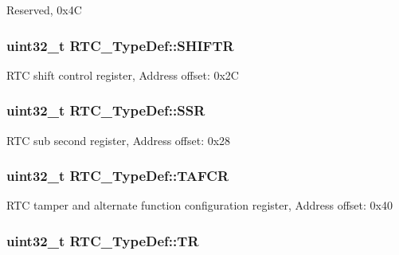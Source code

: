 Reserved, 0x4\-C \hypertarget{struct_r_t_c___type_def_a6082856c9191f5003b6163c0d3afcaff}{
\subsubsection[{S\-H\-I\-F\-T\-R}]{ uint32\-\_\-t R\-T\-C\-\_\-\-Type\-Def\-::\-S\-H\-I\-F\-T\-R}}\label{struct_r_t_c___type_def_a6082856c9191f5003b6163c0d3afcaff}
R\-T\-C shift control register, Address offset\-: 0x2\-C \hypertarget{struct_r_t_c___type_def_aefbd38be87117d1fced289bf9c534414}{
\subsubsection[{S\-S\-R}]{ uint32\-\_\-t R\-T\-C\-\_\-\-Type\-Def\-::\-S\-S\-R}}\label{struct_r_t_c___type_def_aefbd38be87117d1fced289bf9c534414}
R\-T\-C sub second register, Address offset\-: 0x28 \hypertarget{struct_r_t_c___type_def_a498ecce9715c916dd09134fddd0072c0}{
\subsubsection[{T\-A\-F\-C\-R}]{ uint32\-\_\-t R\-T\-C\-\_\-\-Type\-Def\-::\-T\-A\-F\-C\-R}}\label{struct_r_t_c___type_def_a498ecce9715c916dd09134fddd0072c0}
R\-T\-C tamper and alternate function configuration register, Address offset\-: 0x40 \hypertarget{struct_r_t_c___type_def_a2e8783857f8644a4eb80ebc51e1cba42}{
\subsubsection[{T\-R}]{ uint32\-\_\-t R\-T\-C\-\_\-\-Type\-Def\-::\-T\-R}}\label{struct_r_t_c___type_def_a2e8783857f8644a4eb80ebc51e1cba42}
